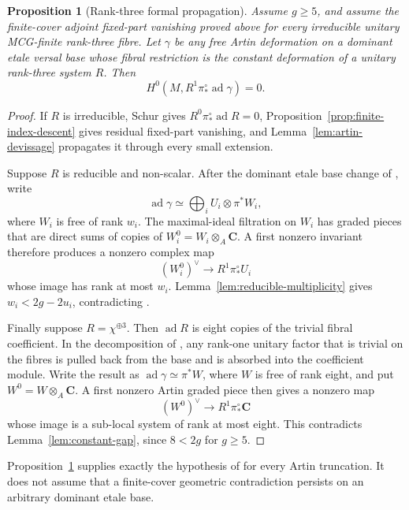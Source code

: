\documentclass[11pt]{article}
\newtheorem{proposition}[theorem]{Proposition}
\theoremstyle{definition}
\newcommand{\C}{\mathbf C}
\newcommand{\ad}{\operatorname{ad}}
\begin{document}
\begin{proposition}[Rank-three formal propagation]
\label{prop:formal-propagation}
Assume $g\ge5$, and assume the finite-cover adjoint fixed-part vanishing
proved above for every irreducible unitary MCG-finite rank-three fibre.  Let
$\gamma$ be any free Artin deformation on a dominant etale versal base whose
fibral restriction is the constant deformation of a unitary rank-three
system $R$.  Then
\[
 H^0(M,R^1\pi_*^\circ\ad\gamma)=0.
\]
\end{proposition}

\begin{proof}
If $R$ is irreducible, Schur gives $R^0\pi_*^\circ\ad R=0$,
Proposition~\ref{prop:finite-index-descent} gives residual fixed-part
vanishing, and Lemma~\ref{lem:artin-devissage} propagates it through every
small extension.

Suppose $R$ is reducible and non-scalar.  After the dominant etale base
change of \cite[Lemma 2.4.2]{LLCan}, write
\[
 \ad\gamma\simeq\bigoplus_i U_i\otimes\pi^*W_i,
\]
where $W_i$ is free of rank $w_i$.  The maximal-ideal filtration on $W_i$
has graded pieces that are direct sums of copies of
$W_i^0=W_i\otimes_A\C$.  A first nonzero invariant therefore produces a
nonzero complex map
\[
 (W_i^0)^\vee\longrightarrow R^1\pi_*^\circ U_i
\]
whose image has rank at most $w_i$.  Lemma~\ref{lem:reducible-multiplicity}
gives $w_i<2g-2u_i$, contradicting \cite[Theorem 1.7.1]{LLCan}.

Finally suppose $R=\chi^{\oplus3}$.  Then $\ad R$ is eight copies of the
trivial fibral coefficient.  In the decomposition of
\cite[Lemma 2.4.2]{LLCan}, any rank-one unitary factor that is trivial on
the fibres is pulled back from the base and is absorbed into the coefficient
module.  Write the result as $\ad\gamma\simeq\pi^*W$, where $W$ is free of
rank eight, and put $W^0=W\otimes_A\C$.  A first nonzero Artin graded piece
then gives a nonzero map
\[
 (W^0)^\vee\longrightarrow R^1\pi_*^\circ\C
\]
whose image is a sub-local system of rank at most eight.  This contradicts
Lemma~\ref{lem:constant-gap}, since $8<2g$ for $g\ge5$.
\end{proof}

Proposition~\ref{prop:formal-propagation} supplies exactly the hypothesis of
\cite[Proposition 3.2.1]{LLCan} for every Artin truncation.  It does not
assume that a finite-cover geometric contradiction persists on an arbitrary
dominant etale base.
\end{document}
